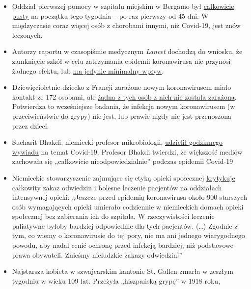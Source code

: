 \begin{itemize}
{  pusta}. Według urzędników liczba nowych pacjentów przyjmowanych do
  szpitali pozostaje na stałym poziomie.
\item
  Oddział pierwszej pomocy w szpitalu miejskim w Bergamo był
  \href{https://orf.at/stories/3162642/}{całkowicie pusty} na początku
  tego tygodnia -- po raz pierwszy od 45 dni. W międzyczasie coraz
  więcej osób z chorobami innymi, niż Covid-19, jest znów leczonych.
\item
  Autorzy raportu w czasopiśmie medycznym \emph{Lancet} dochodzą do
  wniosku, że zamknięcie szkół w celu zatrzymania epidemii koronawirusa
  nie przynosi żadnego efektu, lub
  \href{https://www.thelancet.com/journals/lanchi/article/PIIS2352-4642(20)30095-X/fulltext}{ma
  jedynie minimalny wpływ}.
\item
  Dziewięcioletnie dziecko z Francji zarażone nowym koronawirusem miało
  kontakt ze 172 osobami, ale
  \href{https://www.n-tv.de/panorama/172-Kontaktpersonen-von-Corona-verschont-article21727469.html}{żadna
  z tych osób z nich nie została zarażona}. Potwierdza to wcześniejsze
  badania, że infekcja nowym koronawirusem (w przeciwieństwie do grypy)
  nie jest, lub prawie nigdy nie jest przenoszona przez dzieci.
\item
  Sucharit Bhakdi, niemiecki profesor mikrobiologii,
  \href{https://kenfm.de/kenfm-am-set-gespraech-mit-prof-dr-sucharit-bhakdi-zu-covid-19/}{udzielił
  godzinnego wywiadu} na temat Covid-19. Profesor Bhakdi twierdzi, że
  większość mediów zachowała się „całkowicie nieodpowiedzialnie''
  podczas epidemii Covid-19
\item
  Niemieckie stowarzyszenie zajmujące się etyką opieki społecznej
  \href{http://pflegeethik-initiative.de/2020/04/15/corona-krise-falsche-prioritaeten-gesetzt-und-ethische-prinzipien-verletzt/}{krytykuje}
  całkowity zakaz odwiedzin i bolesne leczenie pacjentów na oddziałach
  intensywnej opieki: „Jeszcze przed epidemią koronawirusa około 900
  starszych osób wymagających opieki umierało codziennie w niemieckich
  domach opieki społecznej bez zabierania ich do szpitala. W
  rzeczywistości leczenie paliatywne byłoby bardziej odpowiednie dla
  tych pacjentów. (\ldots{}) Zgodnie z tym, co wiemy o koronawirusie do
  tej pory, nie ma ani jednego wiarygodnego powodu, aby nadal cenić
  ochronę przed infekcją bardziej, niż podstawowe prawa obywateli.
  Znieśmy nieludzkie zakazy odwiedzin!''
\item
  Najstarsza kobieta w szwajcarskim kantonie St. Gallen zmarła w zeszłym
  tygodniu w wieku 109 lat. Przeżyła „hiszpańską grypę'' w 1918 roku,

\end{itemize}
